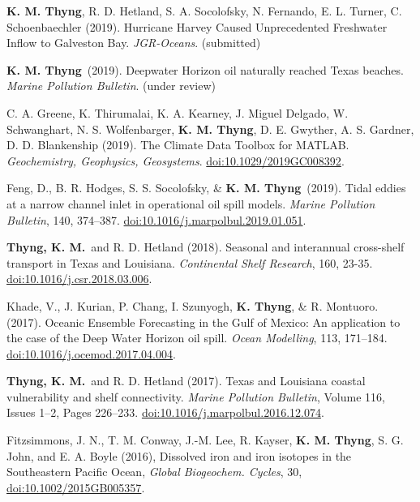 \documentclass[10pt,letterpaper]{article}
\newcommand{\kmt}{\textbf{K. M. Thyng}}
\newcommand{\tkm}{\textbf{Thyng, K. M.}}
\newcommand{\kt}{\textbf{K. Thyng}}
\renewenvironment{itemize}{
  \begin{list}{}{
    \setlength{\leftmargin}{1.5em}
    \setlength{\itemsep}{0.25em}
    \setlength{\parskip}{0pt}
    \setlength{\parsep}{0.25em}
  }
}{
  \end{list}
}
\begin{document}
\begin{itemize}

\item \kmt, R. D. Hetland, S. A. Socolofsky, N. Fernando, E. L. Turner, C. Schoenbaechler (2019). Hurricane Harvey Caused Unprecedented Freshwater Inflow to Galveston Bay. \textit{JGR-Oceans}. (submitted)

\item \kmt~(2019). Deepwater Horizon oil naturally reached Texas beaches. \textit{Marine Pollution Bulletin}. (under review)

\item C. A. Greene,  K. Thirumalai,  K. A. Kearney,  J. Miguel Delgado,  W. Schwanghart,  N. S. Wolfenbarger,  \kmt,  D. E. Gwyther,  A. S. Gardner,  D. D. Blankenship (2019). The Climate Data Toolbox for MATLAB.  \textit{Geochemistry, Geophysics, Geosystems}. \href{https://agupubs.onlinelibrary.wiley.com/doi/abs/10.1029/2019GC008392}{doi:10.1029/2019GC008392}.

\item Feng, D., B. R. Hodges, S. S. Socolofsky, & \kmt~(2019). Tidal eddies at a narrow channel inlet in operational oil spill models.  \textit{Marine Pollution Bulletin}, 140, 374--387. \href{https://www.sciencedirect.com/science/article/pii/S0025326X19300712?via%3Dihub}{doi:10.1016/j.marpolbul.2019.01.051}.

\item \tkm~and R. D. Hetland (2018). Seasonal and interannual cross-shelf transport in Texas and Louisiana. \textit{Continental Shelf Research}, 160, 23-35. \href{https://www.sciencedirect.com/science/article/pii/S0278434317302509}{doi:10.1016/j.csr.2018.03.006}.

\item Khade, V., J. Kurian, P. Chang, I. Szunyogh, \kt, & R. Montuoro. (2017). Oceanic Ensemble Forecasting in the Gulf of Mexico: An application to the case of the Deep Water Horizon oil spill. \textit{Ocean Modelling}, 113, 171--184.  \href{http://www.sciencedirect.com/science/article/pii/S1463500317300525}{doi:10.1016/j.ocemod.2017.04.004}.

\item \tkm~and R. D. Hetland (2017). Texas and Louisiana coastal vulnerability and shelf connectivity. \textit{Marine Pollution Bulletin}, Volume 116, Issues 1--2, Pages 226--233. \href{http://www.sciencedirect.com/science/article/pii/S0025326X16310773}{doi:10.1016/j.marpolbul.2016.12.074}.

\item Fitzsimmons, J. N., T. M. Conway, J.-M. Lee, R. Kayser, \kmt, S. G. John, and E. A. Boyle (2016), Dissolved iron and iron isotopes in the Southeastern Pacific Ocean, \textit{Global Biogeochem. Cycles}, 30,\\ \href{http://onlinelibrary.wiley.com/doi/10.1002/2015GB005357/full}{doi:10.1002/2015GB005357}.


\end{itemize}
\end{document}

